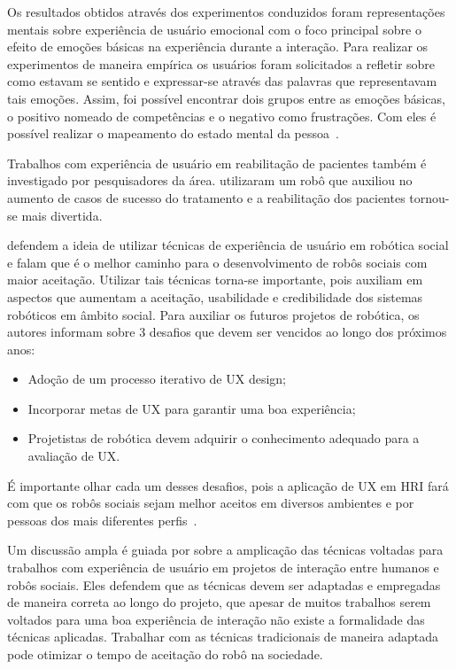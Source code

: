 Os resultados obtidos através dos experimentos conduzidos foram representações mentais sobre experiência de usuário emocional com o foco principal sobre o efeito de emoções básicas na experiência durante a interação. Para realizar os experimentos de maneira empírica os usuários foram solicitados a refletir sobre como estavam se sentido e expressar-se através das palavras que representavam tais emoções. Assim, foi possível encontrar dois grupos entre as emoções básicas, o positivo nomeado de competências e o negativo como frustrações. Com eles é possível realizar o mapeamento do estado mental da pessoa~\cite{saariluoma:2014}.

Trabalhos com experiência de usuário em reabilitação de pacientes também é investigado por pesquisadores da área.  utilizaram um robô que auxiliou no aumento de casos de sucesso do tratamento e a reabilitação dos pacientes tornou-se mais divertida.

 defendem a ideia de utilizar técnicas de experiência de usuário em robótica social e falam que é o melhor caminho para o desenvolvimento de robôs sociais com maior aceitação. Utilizar tais técnicas torna-se importante, pois auxiliam em aspectos que aumentam a aceitação, usabilidade e credibilidade dos sistemas robóticos em âmbito social. Para auxiliar os futuros projetos de robótica, os autores informam sobre 3 desafios que devem ser vencidos ao longo dos próximos anos:

\begin{itemize}
    \item Adoção de um processo iterativo de UX design;
    \item Incorporar metas de UX para garantir uma boa experiência;
    \item Projetistas de robótica devem adquirir o conhecimento adequado para a avaliação de UX.
\end{itemize}

É importante olhar cada um desses desafios, pois a aplicação de UX em HRI fará com que os robôs sociais sejam melhor aceitos em diversos ambientes e por pessoas dos mais diferentes perfis~\cite{lindblom:2016}.

Um discussão ampla é guiada por  sobre a amplicação das técnicas voltadas para trabalhos com experiência de usuário em projetos de interação entre humanos e robôs sociais. Eles defendem que as técnicas devem ser adaptadas e empregadas de maneira correta ao longo do projeto, que apesar de muitos trabalhos serem voltados para uma boa experiência de interação não existe a formalidade das técnicas aplicadas. Trabalhar com as técnicas tradicionais de maneira adaptada pode otimizar o tempo de aceitação do robô na sociedade.
